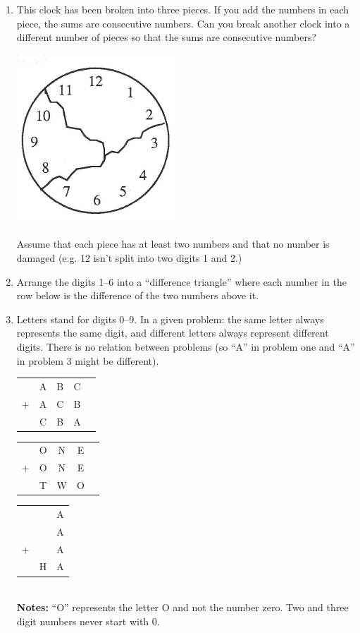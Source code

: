 \begin{enumerate}

\item
 This clock has been broken into three pieces.  If you add the numbers in each piece, the sums are consecutive numbers.  Can you break another clock into a different number of pieces so that the sums are consecutive numbers?  
\begin{center}
\includegraphics[height=3 cm]{../Pictures/ProbSolvingPics/clock}
\end{center}
Assume that each piece has at least two numbers and that no number is damaged (e.g. 12 isn't split into two digits 1 and 2.) 




\item
Arrange the digits 1--6 into a ``difference triangle'' where each number in the row below is the difference of the two numbers above it.\\

\item
Letters stand for digits 0--9.  In a given problem: the same letter always represents the same digit, and different letters always represent different digits.  There is no relation between problems (so ``A'' in problem one and ``A'' in problem 3 might be different).

\begin{tabular}{c c c c c }
& A & B & C\\
$+$& A & C & B\\\hline
& C & B & A\\
\end{tabular}
\qquad
\begin{tabular}{c c c c c }
& O & N & E\\
$+$& O & N & E\\\hline
& T & W & O\\
\end{tabular}
\qquad
\begin{tabular}{c c c }
&& A \\
&& A \\
$+$&& A \\\hline
&H& A \\
\end{tabular}\\
{\bf Notes:} ``O'' represents the letter O and not the number zero.  Two and three digit numbers never start with 0.  



\end{enumerate}
